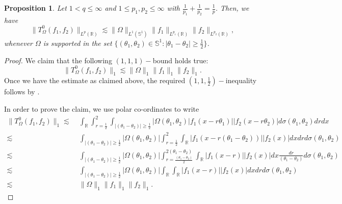 \documentclass[a4paper,reqno]{amsart}
\newcommand{\R}{{\mathbb R}}       %
\newcommand{\Sp}{{\mathbb S}}
\newtheorem{proposition}[theorem]{Proposition}
\theoremstyle{definition}
\numberwithin{equation}{section}
\begin{document}
\begin{proposition}
	Let $1<q\leq\infty$ and $1\leq p_1,p_2\leq\infty$ with $\frac{1}{p_1}+\frac{1}{p_2}=\frac{1}{p}$. Then, we have 
	\begin{equation}\label{singlescale:Lpbound_d=1}
		\|T^0_\Omega(f_1,f_2)\|_{{L^{p}(\R)}}\lesssim\|\Omega\|_{L^1(\Sp^{1})}\|f_1\|_{{L^{p_1}(\R)}}\|f_2\|_{{L^{p_2}(\R)}},
	\end{equation}
	whenever $\Omega$ is supported in the set $\{(\theta_1,\theta_2)\in\Sp^1:|\theta_1-\theta_2|\geq\frac{1}{2}\}$.
\end{proposition}
\begin{proof}
	We claim that the following $(1,1,1)-$bound holds true:
	\[\|T_\Omega^0(f_1,f_2)\|_1\lesssim\|\Omega\|_1\|f_1\|_1\|f_2\|_1.\]
	Once we have the estimate as claimed above, the required $(1,1,\frac{1}{2})-$inequality follows by . 
	
	In order to prove the claim, we use polar co-ordinates to write
	\begin{align*}
		\|T_\Omega^0(f_1,f_2)\|_1\lesssim&\;\int_{\R}\int_{r=\frac{1}{2}}^2\int_{|(\theta_1-\theta_2)|\geq\frac{1}{2}}|\Omega(\theta_1,\theta_2)|f_1(x-r\theta_1)||f_2(x-r\theta_2)|d\sigma(\theta_1,\theta_2)drdx\\
		\lesssim&\;\int_{|(\theta_1-\theta_2)|\geq\frac{1}{2}}|\Omega(\theta_1,\theta_2)|\int_{r=\frac{1}{2}}^2\int_{\R}|f_1(x-r(\theta_1-\theta_2))||f_2(x)|dxdrd\sigma(\theta_1,\theta_2)\\
		\lesssim&\;\int_{|(\theta_1-\theta_2)|\geq\frac{1}{2}}|\Omega(\theta_1,\theta_2)|\int_{r=\frac{(\theta_1-\theta_2)}{2}}^{2(\theta_1-\theta_2)}\int_{\R}|f_1(x-r)||f_2(x)|dx\frac{dr}{(\theta_1-\theta_2)}d\sigma(\theta_1,\theta_2)\\
		\lesssim&\;\int_{|(\theta_1-\theta_2)|\geq\frac{1}{2}}|\Omega(\theta_1,\theta_2)|\int_{\R}\int_{\R}|f_1(x-r)||f_2(x)|dxdrd\sigma(\theta_1,\theta_2)\\
		\lesssim&\;\|\Omega\|_1\|f_1\|_1\|f_2\|_1.
	\end{align*}
\end{proof}
\end{document}

